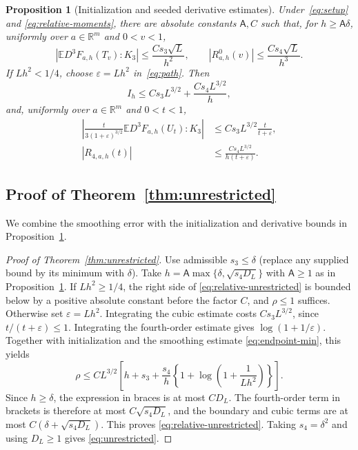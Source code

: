 \documentclass[11pt,letterpaper]{article}
\newtheorem{proposition}{Proposition}
\theoremstyle{remark}
\newcommand{\E}{\mathbb E}
\newcommand{\R}{\mathbb R}
\begin{document}
\begin{proposition}[Initialization and seeded derivative estimates]
\label{an:prop:derivative}
Under~\eqref{eq:setup} and \eqref{eq:relative-moments}, there are absolute constants \(\mathsf A,C\)
such that, for \(h\ge\mathsf A\delta\), uniformly over
\(a\in\R^m\) and \(0<v<1\),
\begin{equation}
 |\E D^3F_{a,h}(T_v):K_3|\le\frac{Cs_3\sqrt L}{h^2},
 \qquad |R^0_{a,h}(v)|\le\frac{Cs_4\sqrt L}{h^3}.
 \label{eq:direct-initialization}
\end{equation}
If \(Lh^2<1/4\), choose \(\varepsilon=Lh^2\) in~\eqref{eq:path}.
Then
\begin{equation}
 I_h\le Cs_3 L^{3/2}+\frac{Cs_4L^{3/2}}h,
 \label{eq:initialization-bound}
\end{equation}
and, uniformly over \(a\in\R^m\) and \(0<t<1\),
\begin{equation}
 \begin{aligned}
 \left|\frac{t}{3(1+\varepsilon)^{3/2}}
          \E D^3F_{a,h}(U_t):K_3\right|
 &\le Cs_3 L^{3/2}\frac{t}{t+\varepsilon},\\
 |R_{4,a,h}(t)|&\le\frac{Cs_4L^{3/2}}{h(t+\varepsilon)}.
 \end{aligned}
 \label{eq:seeded-derivatives}
\end{equation}

\end{proposition}
\subsection{Proof of Theorem~\ref*{thm:unrestricted}}\label{sec:proof-theorem-one}

We combine the smoothing error with the initialization and derivative
bounds in Proposition~\ref{an:prop:derivative}.

\begin{proof}[Proof of Theorem~\ref{thm:unrestricted}]
Use admissible $s_3\le\delta$ (replace any supplied bound by its minimum with $\delta$). Take $h=\mathsf A\max\{\delta,\sqrt{s_4D_L}\}$ with $\mathsf A\ge1$ as in Proposition~\ref{an:prop:derivative}. If $Lh^2\ge1/4$, the right side of \eqref{eq:relative-unrestricted} is bounded below by a positive absolute constant before the factor $C$, and $\rho\le1$ suffices. Otherwise set $\varepsilon=Lh^2$. Integrating the cubic estimate costs $Cs_3L^{3/2}$, since $t/(t+\varepsilon)\le1$. Integrating the fourth-order estimate gives $\log(1+1/\varepsilon)$. Together with initialization and the smoothing estimate \eqref{eq:endpoint-min}, this yields
\[
 \rho\le C L^{3/2}\left[h+s_3+
 \frac{s_4}{h}\left\{1+\log\!\left(1+\frac1{Lh^2}\right)\right\}\right].
\]
Since $h\ge\delta$, the expression in braces is at most $C D_L$. The fourth-order term in brackets is therefore at most $C\sqrt{s_4D_L}$, and the boundary and cubic terms are at most $C(\delta+\sqrt{s_4D_L})$. This proves \eqref{eq:relative-unrestricted}. Taking $s_4=\delta^2$ and using $D_L\ge1$ gives \eqref{eq:unrestricted}.
\end{proof}
\end{document}
